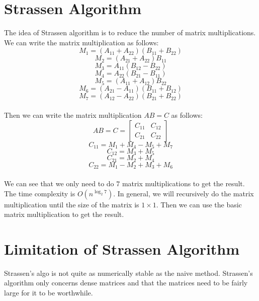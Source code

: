 \documentclass{article}
\begin{document}
\section{Strassen Algorithm}
The idea of Strassen algorithm is to reduce the number of matrix multiplications.
We can write the matrix multiplication as follows:
\begin{equation}
    M_1 = (A_{11} + A_{22})(B_{11} + B_{22})
\end{equation}
\begin{equation}
    M_2 = (A_{21} + A_{22})B_{11}
\end{equation}
\begin{equation}
    M_3 = A_{11}(B_{12} - B_{22})
\end{equation}
\begin{equation}
    M_4 = A_{22}(B_{21} - B_{11})
\end{equation}
\begin{equation}
    M_5 = (A_{11} + A_{12})B_{22}
\end{equation}
\begin{equation}
    M_6 = (A_{21} - A_{11})(B_{11} + B_{12})
\end{equation}
\begin{equation}
    M_7 = (A_{12} - A_{22})(B_{21} + B_{22})
\end{equation}\\
Then we can write the matrix multiplication $AB = C$ as follows:
\begin{equation}
    AB = C = \begin{bmatrix}
        C_{11} & C_{12} \\
        C_{21} & C_{22}
    \end{bmatrix}
\end{equation}
\begin{equation}
    C_{11} = M_1 + M_4 - M_5 + M_7
\end{equation}
\begin{equation}
    C_{12} = M_3 + M_5
\end{equation}
\begin{equation}
    C_{21} = M_2 + M_4
\end{equation}
\begin{equation}
    C_{22} = M_1 - M_2 + M_3 + M_6
\end{equation}\\
We can see that we only need to do $7$ matrix multiplications to get the result. The time complexity is $O(n^{\log_2 7})$.
In general, we will recursively do the matrix multiplication until the size of the matrix is $1 \times 1$.
Then we can use the basic matrix multiplication to get the result.

\section{Limitation of Strassen Algorithm}
Strassen's algo is not quite as numerically stable as the naive method. Strassen's algorithm only concerns dense matrices and that the matrices need to be fairly large for it to be worthwhile.
\end{document}
